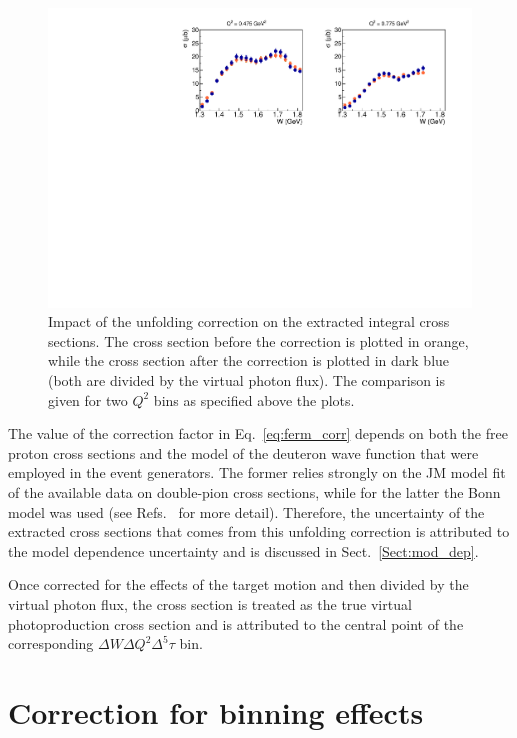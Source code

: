 \begin{figure}[htp]
\begin{center}
\includegraphics[width=14cm]{pictures/corrections/fermi_cor_nocor_int.pdf}
\caption{\small Impact of the unfolding correction on the extracted integral cross sections. The cross section before the correction is plotted in orange, while the cross section after the correction is plotted in dark blue (both are divided by the virtual photon flux). The comparison is given for two $Q^{2}$ bins as specified above the plots. } \label{ferm_cor_nocor_int}
\end{center}
\end{figure}

The value of the correction factor in Eq.~\eqref{eq:ferm_corr} depends on both the free proton cross sections and the model of the deuteron wave function that were employed in the event generators. The former relies strongly on the JM model fit of the available data on double-pion cross sections, while for the latter the Bonn model was used (see Refs.~\cite{twopeg,twopeg-d} for more detail). Therefore, the uncertainty of the extracted cross sections that comes from this unfolding correction is attributed to the model dependence uncertainty and is discussed in Sect.~\ref{Sect:mod_dep}. 

Once corrected for the effects of the target motion and then divided by the virtual photon flux, the cross section is treated as the true virtual photoproduction cross section and is attributed to the central point of the corresponding $\Delta W \Delta Q^{2}\Delta^{5}\tau$ bin.


\section{Correction for binning effects}
\label{Sect:bin_cor}

